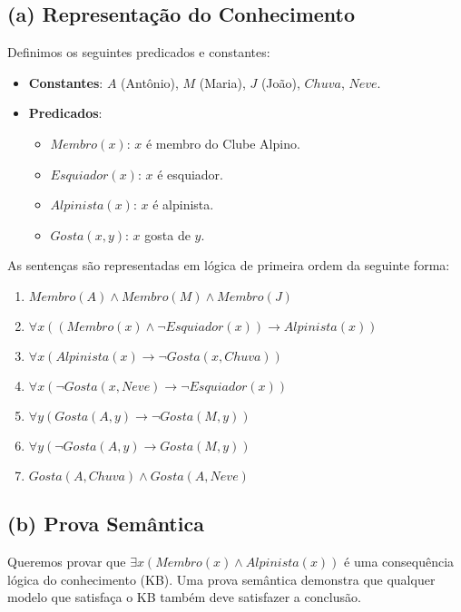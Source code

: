 \documentclass{article}
\begin{document}
\subsection*{(a) Representação do Conhecimento}
Definimos os seguintes predicados e constantes:
\begin{itemize}
    \item \textbf{Constantes}: $A$ (Antônio), $M$ (Maria), $J$ (João), $Chuva$, $Neve$.
    \item \textbf{Predicados}:
    \begin{itemize}
        \item $Membro(x)$: $x$ é membro do Clube Alpino.
        \item $Esquiador(x)$: $x$ é esquiador.
        \item $Alpinista(x)$: $x$ é alpinista.
        \item $Gosta(x,y)$: $x$ gosta de $y$.
    \end{itemize}
\end{itemize}

As sentenças são representadas em lógica de primeira ordem da seguinte forma:
\begin{enumerate}
    \item $Membro(A) \wedge Membro(M) \wedge Membro(J)$
    \item $\forall x ((Membro(x) \wedge \neg Esquiador(x)) \rightarrow Alpinista(x))$
    \item $\forall x (Alpinista(x) \rightarrow \neg Gosta(x, Chuva))$
    \item $\forall x (\neg Gosta(x, Neve) \rightarrow \neg Esquiador(x))$
    \item $\forall y (Gosta(A, y) \rightarrow \neg Gosta(M, y))$
    \item $\forall y (\neg Gosta(A, y) \rightarrow Gosta(M, y))$
    \item $Gosta(A, Chuva) \wedge Gosta(A, Neve)$
\end{enumerate}

\subsection*{(b) Prova Semântica}
Queremos provar que $\exists x (Membro(x) \wedge Alpinista(x))$ é uma consequência lógica do conhecimento (KB). Uma prova semântica demonstra que qualquer modelo que satisfaça o KB também deve satisfazer a conclusão.
\end{document}
